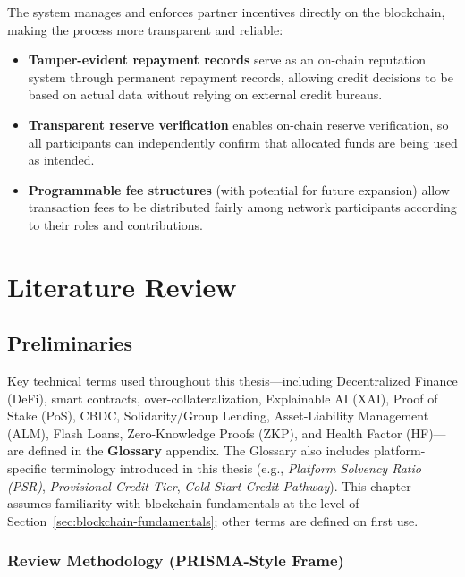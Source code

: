 \documentclass[12pt,a4paper]{report}
\begin{document}
The system manages and enforces partner incentives directly on the blockchain, making the process more transparent and reliable:

\begin{itemize}[noitemsep]
\item \textbf{Tamper-evident repayment records} serve as an on-chain reputation system through permanent repayment records, allowing credit decisions to be based on actual data without relying on external credit bureaus.
\item \textbf{Transparent reserve verification} enables on-chain reserve verification, so all participants can independently confirm that allocated funds are being used as intended.
\item \textbf{Programmable fee structures} (with potential for future expansion) allow transaction fees to be distributed fairly among network participants according to their roles and contributions.
\end{itemize}


\chapter{Literature Review}

\section{Preliminaries}

Key technical terms used throughout this thesis---including Decentralized Finance (DeFi), smart contracts, over-collateralization, Explainable AI (XAI), Proof of Stake (PoS), CBDC, Solidarity/Group Lending, Asset-Liability Management (ALM), Flash Loans, Zero-Knowledge Proofs (ZKP), and Health Factor (HF)---are defined in the \textbf{Glossary} appendix. The Glossary also includes platform-specific terminology introduced in this thesis (e.g., \textit{Platform Solvency Ratio (PSR)}, \textit{Provisional Credit Tier}, \textit{Cold-Start Credit Pathway}). This chapter assumes familiarity with blockchain fundamentals at the level of Section~\ref{sec:blockchain-fundamentals}; other terms are defined on first use.

\subsection{Review Methodology (PRISMA-Style Frame)}
\label{sec:lit-prisma}
\end{document}
